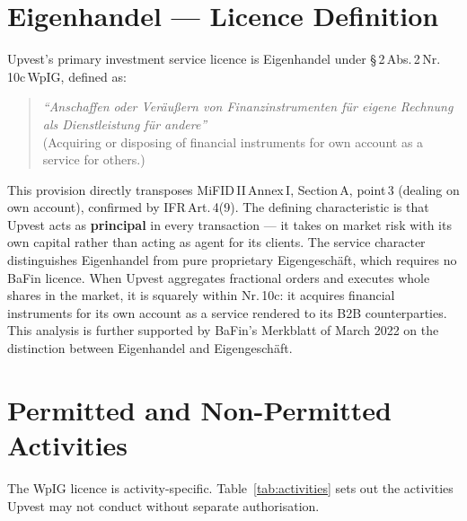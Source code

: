 \documentclass[12pt,a4paper]{report}
\begin{document}
\section{Eigenhandel --- Licence Definition}

Upvest's primary investment service licence is Eigenhandel under
\S\,2\,Abs.\,2\,Nr.\,10c\,WpIG, defined as:

\begin{quote}
\textit{``Anschaffen oder Ver{\"a}u{\ss}ern von Finanzinstrumenten f{\"u}r eigene Rechnung
als Dienstleistung f{\"u}r andere''} \\
(Acquiring or disposing of financial instruments for own account as a service for others.)
\end{quote}

This provision directly transposes MiFID\,II\,Annex\,I, Section\,A, point\,3
(dealing on own account), confirmed by IFR\,Art.\,4(9). The defining characteristic is that
Upvest acts as \textbf{principal} in every transaction --- it takes on market risk with its
own capital rather than acting as agent for its clients. The service character distinguishes
Eigenhandel from pure proprietary Eigengesch{\"a}ft, which requires no BaFin licence. When
Upvest aggregates fractional orders and executes whole shares in the market, it is squarely
within Nr.\,10c: it acquires financial instruments for its own account as a service rendered
to its B2B counterparties. This analysis is further supported by BaFin's Merkblatt of March
2022 on the distinction between Eigenhandel and Eigengesch{\"a}ft.

\section{Permitted and Non-Permitted Activities}

The WpIG licence is activity-specific. Table~\ref{tab:activities} sets out the activities
Upvest may not conduct without separate authorisation.
\end{document}
